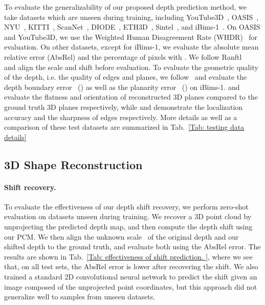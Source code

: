 To evaluate the generalizability of our proposed depth prediction method, we take  datasets which are unseen during training, including YouTube3D~\cite{chen2019learning}, OASIS~\cite{chen2020oasis}, NYU~\cite{silberman2012indoor}, KITTI~\cite{geiger2012we}, ScanNet~\cite{dai2017scannet}, DIODE~\cite{vasiljevic2019diode}, ETH3D~\cite{schops2017multi}, Sintel~\cite{Butler:ECCV:2012}, and iBims-1~\cite{Koch18:ECS}. 
On OASIS and YouTube3D, we use the Weighted Human Disagreement Rate (WHDR)~\cite{xian2018monocular} for evaluation. 
On other datasets, except for iBims-1, we evaluate the absolute mean relative error (AbsRel) and the percentage of pixels with . 
We follow Ranftl~\etal~\cite{Ranftl2020} and align the scale and shift before evaluation. 
To evaluate the geometric quality of the depth, i.e. the quality of edges and planes, we follow~\cite{Niklaus_TOG_2019, xian2020structure} and evaluate the depth boundary error~\cite{Koch18:ECS} () as well as the planarity error~\cite{Koch18:ECS} () on iBims-1. 
 and  evaluate the flatness and orientation
of reconstructed 3D planes compared to the ground truth 3D planes respectively, while  and  demonstrate the localization accuracy and the sharpness of edges respectively. More details as well as a comparison of these test datasets are summarized in Tab.~\ref{Tab: testing data details}

\subsection{3D Shape Reconstruction}

\paragraph{Shift recovery.}
To evaluate the effectiveness of our depth shift recovery, we perform zero-shot evaluation on  datasets unseen during training.
We recover a 3D point cloud by unprojecting the predicted depth map, and then compute the depth shift using our PCM. 
We then align the unknown scale~\cite{bian2019unsupervised, monodepth2} of the original depth and our shifted depth to the ground truth, and evaluate both using the AbsRel error.
The results are shown in Tab.~\ref{Tab: effectiveness of shift prediction. }, where we see that, on all test sets, the AbsRel error is lower after recovering the shift. 
We also trained a standard 2D convolutional neural network to predict the shift given an image composed of the unprojected point coordinates, but this approach did not generalize well to samples from unseen datasets. 





